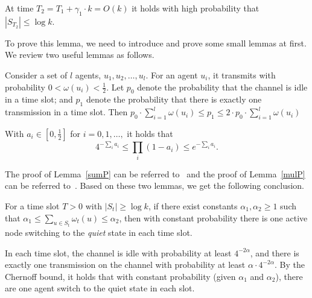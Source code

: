 \begin{lemma}
    \label{fast}
    At time $T_2=T_1 + \gamma_1\cdot k  =O(k)$ 
    it holds with high probability that $|S_{T_2}| \leq \log k$. 
\end{lemma}

To prove this lemma, we need to introduce and prove some small lemmas at first.
We review two useful lemmas as follows.
\begin{lemma}
    \label{sumP}
    Consider a set of $l$ agents, $u_1, u_2,\dots, u_l$.
    For an agent $u_i$, it transmits with probability 
    $0 < \omega(u_i) < \frac{1}{2}$. Let $p_0$ denote the 
    probability that the channel is idle in a time slot; and $p_1$ denote 
    the probability that there is exactly one transmission in a time slot.
    Then $p_0\cdot {\sum}_{i=1}^{l}\omega(u_i)\leq p_1 \leq
    2\cdot p_0\cdot {\sum}_{i=1}^{l}\omega(u_i)$     
\end{lemma}
\begin{lemma}
    \label{mulP}
    With $a_i \in [0, \frac{1}{2}]$ for $i = 0,1,\dots,$ it holds that
    \begin{equation}
        \label{mul}
        4^{-{\sum}_{i}a_i}\leq {\prod}_{i}(1-a_i)\leq e^{-{\sum}_{i}a_i}. 
    \end{equation}
\end{lemma}
The proof of Lemma~\ref{sumP} can be referred to~\cite{Richa2010A}
and the proof of Lemma~\ref{mulP} can be referred to~\cite{Daum2013Maximal}.
Based on these two lemmas, we get the following conclusion.

\begin{lemma}
    \label{safe}
    For a time slot $T>0$ with $|S_t| \ge \log k$, if 
    there exist constants $\alpha_1, \alpha_2 \ge 1$ such that
    $\alpha_1 \leq \sum_{u\in S_t}{\omega}_t(u) \leq \alpha_2$, then with constant probability 
    there is one active node switching to the \emph{quiet} state
    in each time slot. 
\end{lemma}
\begin{IEEEproof}
    In each time slot, the channel is idle with probability at least 
    $4^{-2\alpha}$, and there is exactly one transmission on the channel
    with probability at least $\alpha\cdot 4^{-2\alpha}$. By the Chernoff
    bound, it holds that with constant probability (given $\alpha_1$ and $\alpha_2$),
    there are one agent switch to the quiet state in each slot.
\end{IEEEproof}

